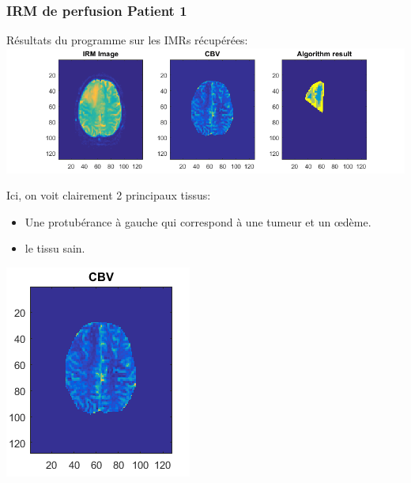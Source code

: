 \documentclass{beamer}
\begin{document}
\begin{frame}
\frametitle{IRM de perfusion Patient 1}


\end{frame}

\begin{frame}

Résultats du programme sur les IMRs récupérées:
\includegraphics[scale=0.40]{Patient2Result.png}

Ici, on voit clairement 2 principaux tissus:
\begin{itemize}
\item Une protubérance à gauche qui correspond à une tumeur et un œdème.
\item le tissu sain.
\end{itemize}
\end{frame}

\begin{frame}
\centering
\includegraphics[scale=0.80]{Patient2Result-CBV.png}

\end{frame}
\end{document}
